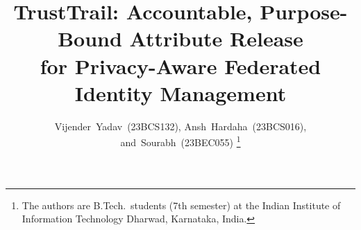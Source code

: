 \documentclass[journal,onecolumn,11pt]{IEEEtran}
\begin{document}
\title{TrustTrail: Accountable, Purpose-Bound Attribute Release\\for Privacy-Aware Federated Identity Management}

\author{Vijender~Yadav~(23BCS132),
        Ansh~Hardaha~(23BCS016),
        and~Sourabh~(23BEC055)%
\thanks{The authors are B.Tech.\ students (7th semester) at the Indian Institute of Information Technology Dharwad, Karnataka, India.}}


\maketitle
















\appendices




\end{document}
